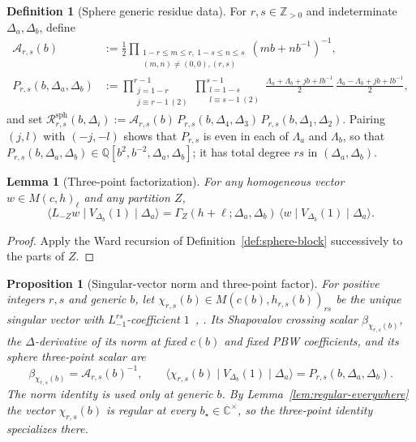 \documentclass[twoside,10pt]{article}
\numberwithin{equation}{section}
\theoremstyle{slbody}
\newtheorem{proposition}[theorem]{Proposition}
\newtheorem{lemma}[theorem]{Lemma}
\theoremstyle{definition}
\newtheorem{definition}[theorem]{Definition}
\theoremstyle{remark}
\begin{document}
\begin{definition}[Sphere generic residue data]\label{def:sphere-residues}
For \(r,s\in\mathbb Z_{>0}\) and indeterminate \(\Delta_a,\Delta_b\), define
\begin{align}
 \mathcal A_{r,s}(b)
 &:=\frac12\prod_{\substack{1-r\leq m\leq r,\ 1-s\leq n\leq s\\(m,n)\neq(0,0),(r,s)}}(mb+nb^{-1})^{-1},
 \label{eq:Ars-def}\\
 P_{r,s}(b,\Delta_a,\Delta_b)
 &:=\prod_{\substack{j=1-r\\j\equiv r-1\ (2)}}^{r-1}
    \prod_{\substack{l=1-s\\l\equiv s-1\ (2)}}^{s-1}
    \frac{\Lambda_a+\Lambda_b+jb+lb^{-1}}{2}\,
    \frac{\Lambda_a-\Lambda_b+jb+lb^{-1}}{2},
 \label{eq:Prs-def}
\end{align}
and set
\(\mathcal R^{\mathrm{sph}}_{r,s}(b,\Delta_i)
:=\mathcal A_{r,s}(b)\,P_{r,s}(b,\Delta_4,\Delta_3)\,P_{r,s}(b,\Delta_1,\Delta_2)\).
Pairing \((j,l)\) with \((-j,-l)\) shows that \(P_{r,s}\) is even in each of
\(\Lambda_a\) and \(\Lambda_b\), so that
\(P_{r,s}(b,\Delta_a,\Delta_b)\in\mathbb Q[b^2,b^{-2},\Delta_a,\Delta_b]\);
it has total degree \(rs\) in \((\Delta_a,\Delta_b)\).
\end{definition}

\begin{lemma}[Three-point factorization]\label{lem:3pt-factor}
For any homogeneous vector \(w\in M(c,h)_\ell\) and any partition \(Z\),
\[
 \langle L_{-Z}w\mid V_{\Delta_b}(1)\mid\Delta_a\rangle
 =\Gamma_Z(h+\ell;\Delta_a,\Delta_b)\,\langle w\mid V_{\Delta_b}(1)\mid\Delta_a\rangle.
\]
\end{lemma}

\begin{proof}
Apply the Ward recursion of Definition~\ref{def:sphere-block} successively to
the parts of \(Z\).
\end{proof}

\begin{proposition}[Singular-vector norm and three-point factor]\label{prop:imported}
For positive integers \(r,s\) and generic \(b\), let
\(\chi_{r,s}(b)\in M(c(b),h_{r,s}(b))_{rs}\) be the unique singular vector
with \(L_{-1}^{rs}\)-coefficient \(1\)~\cite[Propositions~5.1--5.2 and Corollary~5.2]{IoharaKoga2011},
\cite[Theorem~3.1 and Corollary~3.2]{Astashkevich1997}.
Its Shapovalov crossing scalar \(\beta_{\chi_{r,s}(b)}\), the
\(\Delta\)-derivative of its norm at fixed \(c(b)\) and fixed PBW coefficients,
and its sphere three-point scalar are
\begin{equation}\label{eq:imported-ids}
 \beta_{\chi_{r,s}(b)}=\mathcal A_{r,s}(b)^{-1},\qquad
 \langle\chi_{r,s}(b)\mid V_{\Delta_b}(1)\mid\Delta_a\rangle=P_{r,s}(b,\Delta_a,\Delta_b).
\end{equation}
The norm identity is used only at generic \(b\).  By
Lemma~\ref{lem:regular-everywhere} the vector \(\chi_{r,s}(b)\) is regular at
every \(b_\star\in\mathbb C^\times\), so the three-point identity specializes
there.
\end{proposition}
\end{document}
